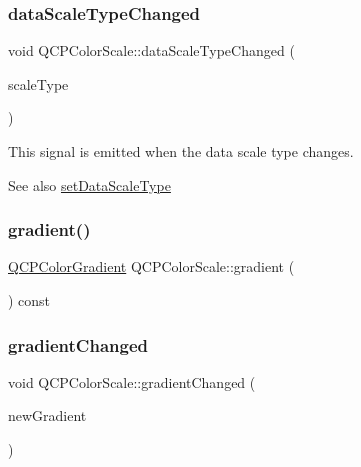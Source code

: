 \mbox{\label{class_q_c_p_color_scale_a61558b962f7791ff2f15a565dcf60181}} 
\subsubsection{\texorpdfstring{dataScaleTypeChanged}{dataScaleTypeChanged}}
{\footnotesize\ttfamily void Q\+C\+P\+Color\+Scale\+::data\+Scale\+Type\+Changed (\begin{DoxyParamCaption}\item[{\mbox{\hyperlink{class_q_c_p_axis_a36d8e8658dbaa179bf2aeb973db2d6f0}{Q\+C\+P\+Axis\+::\+Scale\+Type}}}]{scale\+Type }\end{DoxyParamCaption})\hspace{0.3cm}{\ttfamily [signal]}}

This signal is emitted when the data scale type changes.

\begin{DoxySeeAlso}{See also}
\mbox{\hyperlink{class_q_c_p_color_scale_aeb6107d67dd7325145b2498abae67fc3}{set\+Data\+Scale\+Type}} 
\end{DoxySeeAlso}
\mbox{\label{class_q_c_p_color_scale_a31d4e3b49461bf6b265eabd028d0f7b2}} 
\subsubsection{\texorpdfstring{gradient()}{gradient()}}
{\footnotesize\ttfamily \mbox{\hyperlink{class_q_c_p_color_gradient}{Q\+C\+P\+Color\+Gradient}} Q\+C\+P\+Color\+Scale\+::gradient (\begin{DoxyParamCaption}{ }\end{DoxyParamCaption}) const\hspace{0.3cm}{\ttfamily [inline]}}

\mbox{\label{class_q_c_p_color_scale_a5e5f8c5626242c8f7308bfab74d3d989}} 
\subsubsection{\texorpdfstring{gradientChanged}{gradientChanged}}
{\footnotesize\ttfamily void Q\+C\+P\+Color\+Scale\+::gradient\+Changed (\begin{DoxyParamCaption}\item[{const \mbox{\hyperlink{class_q_c_p_color_gradient}{Q\+C\+P\+Color\+Gradient}} \&}]{new\+Gradient }\end{DoxyParamCaption})\hspace{0.3cm}{\ttfamily [signal]}}

